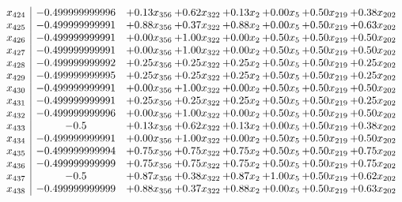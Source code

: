 \documentclass[8pt]{article}
\begin{document}
\[\begin{array}{c| c c@{\hskip 2pt} c@{\hskip 2pt} c@{\hskip 2pt} c@{\hskip 2pt} c@{\hskip 2pt} c@{\hskip 2pt} }
 x_{424}   &  -0.499999999996 & +  0.13 x_{356} & +  0.62 x_{322} & +  0.13 x_{2} & +  0.00 x_{5} & +  0.50 x_{219} & +  0.38 x_{202}\\
 x_{425}   &  -0.499999999991 & +  0.88 x_{356} & +  0.37 x_{322} & +  0.88 x_{2} & +  0.00 x_{5} & +  0.50 x_{219} & +  0.63 x_{202}\\
 x_{426}   &  -0.499999999991 & +  0.00 x_{356} & +  1.00 x_{322} & +  0.00 x_{2} & +  0.50 x_{5} & +  0.50 x_{219} & +  0.50 x_{202}\\
 x_{427}   &  -0.499999999991 & +  0.00 x_{356} & +  1.00 x_{322} & +  0.00 x_{2} & +  0.50 x_{5} & +  0.50 x_{219} & +  0.50 x_{202}\\
 x_{428}   &  -0.499999999992 & +  0.25 x_{356} & +  0.25 x_{322} & +  0.25 x_{2} & +  0.50 x_{5} & +  0.50 x_{219} & +  0.25 x_{202}\\
 x_{429}   &  -0.499999999995 & +  0.25 x_{356} & +  0.25 x_{322} & +  0.25 x_{2} & +  0.50 x_{5} & +  0.50 x_{219} & +  0.25 x_{202}\\
 x_{430}   &  -0.499999999991 & +  0.00 x_{356} & +  1.00 x_{322} & +  0.00 x_{2} & +  0.50 x_{5} & +  0.50 x_{219} & +  0.50 x_{202}\\
 x_{431}   &  -0.499999999991 & +  0.25 x_{356} & +  0.25 x_{322} & +  0.25 x_{2} & +  0.50 x_{5} & +  0.50 x_{219} & +  0.25 x_{202}\\
 x_{432}   &  -0.499999999996 & +  0.00 x_{356} & +  1.00 x_{322} & +  0.00 x_{2} & +  0.50 x_{5} & +  0.50 x_{219} & +  0.50 x_{202}\\
 x_{433}   &  -0.5 & +  0.13 x_{356} & +  0.62 x_{322} & +  0.13 x_{2} & +  0.00 x_{5} & +  0.50 x_{219} & +  0.38 x_{202}\\
 x_{434}   &  -0.499999999991 & +  0.00 x_{356} & +  1.00 x_{322} & +  0.00 x_{2} & +  0.50 x_{5} & +  0.50 x_{219} & +  0.50 x_{202}\\
 x_{435}   &  -0.499999999994 & +  0.75 x_{356} & +  0.75 x_{322} & +  0.75 x_{2} & +  0.50 x_{5} & +  0.50 x_{219} & +  0.75 x_{202}\\
 x_{436}   &  -0.499999999999 & +  0.75 x_{356} & +  0.75 x_{322} & +  0.75 x_{2} & +  0.50 x_{5} & +  0.50 x_{219} & +  0.75 x_{202}\\
 x_{437}   &  -0.5 & +  0.87 x_{356} & +  0.38 x_{322} & +  0.87 x_{2} & +  1.00 x_{5} & +  0.50 x_{219} & +  0.62 x_{202}\\
 x_{438}   &  -0.499999999999 & +  0.88 x_{356} & +  0.37 x_{322} & +  0.88 x_{2} & +  0.00 x_{5} & +  0.50 x_{219} & +  0.63 x_{202}\\

\end{array}\]
\end{document}
